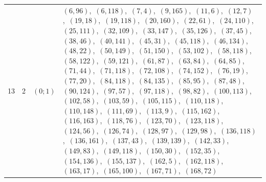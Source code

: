 \documentclass[11pt]{article}
\begin{document}
\begin{longtable}{@{}rrl>{\raggedright\arraybackslash}p{}@{}}
13 & 2 & $(0;1)$ & $(6,96)$,\allowbreak\ $(6,118)$,\allowbreak\ $(7,4)$,\allowbreak\ $(9,165)$,\allowbreak\ $(11,6)$,\allowbreak\ $(12,7)$,\allowbreak\ $(19,18)$,\allowbreak\ $(19,118)$,\allowbreak\ $(20,160)$,\allowbreak\ $(22,61)$,\allowbreak\ $(24,110)$,\allowbreak\ $(25,111)$,\allowbreak\ $(32,109)$,\allowbreak\ $(33,147)$,\allowbreak\ $(35,126)$,\allowbreak\ $(37,45)$,\allowbreak\ $(38,46)$,\allowbreak\ $(40,141)$,\allowbreak\ $(45,31)$,\allowbreak\ $(45,118)$,\allowbreak\ $(46,134)$,\allowbreak\ $(48,22)$,\allowbreak\ $(50,149)$,\allowbreak\ $(51,150)$,\allowbreak\ $(53,102)$,\allowbreak\ $(58,118)$,\allowbreak\ $(58,122)$,\allowbreak\ $(59,121)$,\allowbreak\ $(61,87)$,\allowbreak\ $(63,84)$,\allowbreak\ $(64,85)$,\allowbreak\ $(71,44)$,\allowbreak\ $(71,118)$,\allowbreak\ $(72,108)$,\allowbreak\ $(74,152)$,\allowbreak\ $(76,19)$,\allowbreak\ $(77,20)$,\allowbreak\ $(84,118)$,\allowbreak\ $(84,135)$,\allowbreak\ $(85,95)$,\allowbreak\ $(87,48)$,\allowbreak\ $(90,124)$,\allowbreak\ $(97,57)$,\allowbreak\ $(97,118)$,\allowbreak\ $(98,82)$,\allowbreak\ $(100,113)$,\allowbreak\ $(102,58)$,\allowbreak\ $(103,59)$,\allowbreak\ $(105,115)$,\allowbreak\ $(110,118)$,\allowbreak\ $(110,148)$,\allowbreak\ $(111,69)$,\allowbreak\ $(113,9)$,\allowbreak\ $(115,162)$,\allowbreak\ $(116,163)$,\allowbreak\ $(118,76)$,\allowbreak\ $(123,70)$,\allowbreak\ $(123,118)$,\allowbreak\ $(124,56)$,\allowbreak\ $(126,74)$,\allowbreak\ $(128,97)$,\allowbreak\ $(129,98)$,\allowbreak\ $(136,118)$,\allowbreak\ $(136,161)$,\allowbreak\ $(137,43)$,\allowbreak\ $(139,139)$,\allowbreak\ $(142,33)$,\allowbreak\ $(149,83)$,\allowbreak\ $(149,118)$,\allowbreak\ $(150,30)$,\allowbreak\ $(152,35)$,\allowbreak\ $(154,136)$,\allowbreak\ $(155,137)$,\allowbreak\ $(162,5)$,\allowbreak\ $(162,118)$,\allowbreak\ $(163,17)$,\allowbreak\ $(165,100)$,\allowbreak\ $(167,71)$,\allowbreak\ $(168,72)$\\

\end{longtable}
\end{document}
